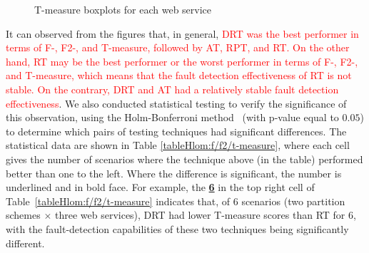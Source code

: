 \documentclass[10pt,journal,compsoc]{IEEEtran}
\begin{document}
\begin{figure}
	\centering
	\caption{T-measure boxplots for each web service}
	\label{fig:Tmeasure}
\end{figure}

It can observed from the figures that, in general, \textcolor{red}{DRT was the best performer in terms of F-, F2-, and T-measure, followed by AT, RPT, and RT. On the other hand, RT may be the best performer or the worst performer in terms of F-, F2-, and T-measure, which means that the fault detection effectiveness of RT is not stable. On the contrary, DRT and AT had a relatively stable fault detection effectiveness}.
We also conducted statistical testing to verify the significance of this observation, using the Holm-Bonferroni method~\cite{sun2018adaptive} (with p-value equal to $0.05$) to determine which pairs of testing techniques had significant differences.
The statistical data are shown in Table \ref{tableHlom:f/f2/t-measure}, where each cell gives the number of scenarios where the technique above (in the table) performed better than one to the left.
Where the difference is significant, the number is underlined and in bold face.
For example, the \underline{\textbf{6}} in the top right cell of Table~\ref{tableHlom:f/f2/t-measure} indicates that, of 6 scenarios (two partition schemes $\times$ three web services), DRT had lower T-measure scores than RT for 6, with the fault-detection capabilities of these two techniques being significantly different.
\end{document}

